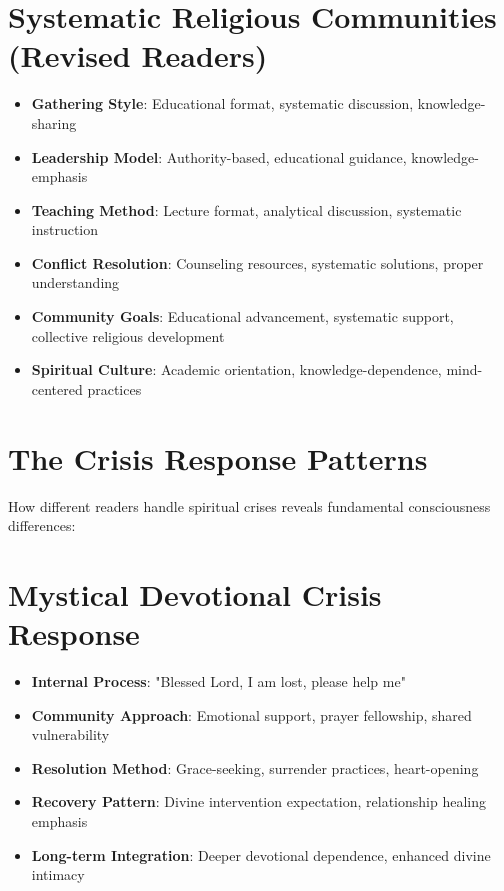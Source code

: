 \documentclass[11pt,twoside]{book}
\begin{document}
\section*{Systematic Religious Communities (Revised Readers)}
\label{sec:orgf99d31a}
\begin{itemize}
\item \textbf{\textbf{Gathering Style}}: Educational format, systematic discussion, knowledge-sharing
\item \textbf{\textbf{Leadership Model}}: Authority-based, educational guidance, knowledge-emphasis
\item \textbf{\textbf{Teaching Method}}: Lecture format, analytical discussion, systematic instruction
\item \textbf{\textbf{Conflict Resolution}}: Counseling resources, systematic solutions, proper understanding
\item \textbf{\textbf{Community Goals}}: Educational advancement, systematic support, collective religious development
\item \textbf{\textbf{Spiritual Culture}}: Academic orientation, knowledge-dependence, mind-centered practices
\end{itemize}
\section*{The Crisis Response Patterns}
\label{sec:org4d8a9ea}

How different readers handle spiritual crises reveals fundamental consciousness differences:
\section*{Mystical Devotional Crisis Response}
\label{sec:orgb5a0376}
\begin{itemize}
\item \textbf{\textbf{Internal Process}}: "Blessed Lord, I am lost, please help me"
\item \textbf{\textbf{Community Approach}}: Emotional support, prayer fellowship, shared vulnerability
\item \textbf{\textbf{Resolution Method}}: Grace-seeking, surrender practices, heart-opening
\item \textbf{\textbf{Recovery Pattern}}: Divine intervention expectation, relationship healing emphasis
\item \textbf{\textbf{Long-term Integration}}: Deeper devotional dependence, enhanced divine intimacy
\end{itemize}
\end{document}
